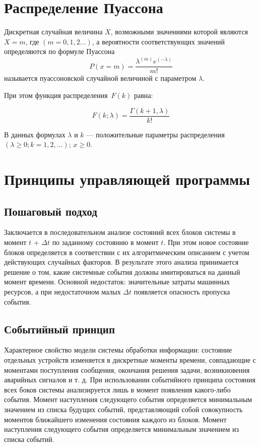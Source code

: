 \documentclass{bmstu}
\begin{document}
\section{Распределение Пуассона}

Дискретная случайная величина $X$, возможными значениями которой являются $X=m$, где $(m=0,1,2...)$, а вероятности соответствующих значений определяются по формуле Пуассона
\begin{equation}
	P(x = m) = \frac{\lambda^{(m)} e^{(-\lambda)}}{m!}	
\end{equation}
называется пуассоновской случайной величиной с параметром $\lambda$.

При этом функция распределения~$F(k)$ равна:

\begin{equation}
	F(k; \lambda) = \frac{\Gamma(k+1, \lambda)}{k!}
\end{equation}


В данных формулах $\lambda$ и $k$ --- положительные параметры распределения $(\lambda \geqslant 0; k = 1, 2, ...)$;
$x \geqslant 0$.

\clearpage

\section{Принципы управляющей программы}

\subsection{Пошаговый подход}

Заключается в последовательном анализе состояний всех блоков системы в момент $t$ + $\Delta t$ по заданному состоянию в момент $t$. При этом новое состояние блоков определяется в соответствии с их алгоритмическим описанием с учетом действующих случайных факторов. В результате этого анализа принимается решение о том, какие системные события должны имитироваться на данный момент времени. Основной недостаток: значительные затраты машинных ресурсов, а при недостаточном малых $\Delta t$ появляется опасность пропуска события.

\subsection{Событийный принцип}

Характерное свойство модели системы обработки информации: состояние отдельных устройств изменяется в дискретные моменты времени, совпадающие с моментами поступления сообщения, окончания решения задачи, возникновения аварийных сигналов и т. д. При использовании событийного принципа состояния всех боков системы анализируется лишь в момент появления какого-либо события. Момент наступления следующего события определяется минимальным значением из списка будущих событий, представляющий собой совокупность моментов ближайшего изменения состояния каждого из блоков. Момент наступления следующего события определяется минимальным значением из списка событий.
\end{document}
